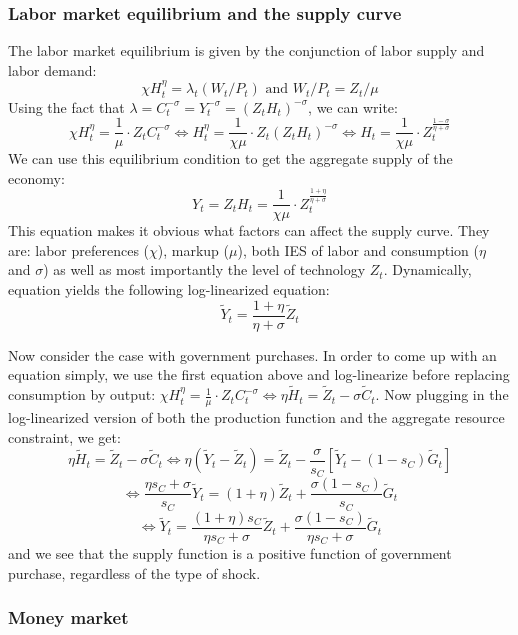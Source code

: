 \documentclass[12pt]{report}
\begin{document}
\subsubsection{Labor market equilibrium and the supply curve}

The labor market equilibrium is given by the conjunction of labor supply and labor demand: $$\chi H_t^\eta = \lambda_t(W_t/P_t) \text{ and } W_t/P_t = Z_t/\mu  $$ Using the fact that $\lambda = C_t^{-\sigma} = Y_t^{-\sigma} = (Z_tH_t)^{-\sigma}$, we can write: $$\chi H_t^\eta = \frac{1}{\mu}\cdot Z_t C_t^{-\sigma}  \Leftrightarrow H_t^\eta = \frac{1}{\chi\mu}\cdot Z_t (Z_t H_t)^{-\sigma} \Leftrightarrow H_t = \frac{1}{\chi\mu}\cdot Z_t^{\frac{1-\sigma}{\eta+\sigma}} $$ We can use this equilibrium condition to get the aggregate supply of the economy: $$ Y_t = Z_t H_t = \frac{1}{\chi\mu}\cdot Z_t^{\frac{1+\eta}{\eta+\sigma}} $$ This equation makes it obvious what factors can affect the supply curve. They are: labor preferences ($\chi$), markup ($\mu$), both IES of labor and consumption ($\eta$ and $\sigma$) as well as most importantly the level of technology $Z_t$. Dynamically, equation yields the following log-linearized equation: $$\tilde Y_t = \frac{1+\eta}{\eta+\sigma} \tilde Z_t $$

Now consider the case with government purchases. In order to come up with an equation simply, we use the first equation above and log-linearize before replacing consumption by output: $\chi H_t^\eta = \frac{1}{\mu}\cdot Z_t C_t^{-\sigma}  \Leftrightarrow \eta\tilde H_t = \tilde Z_t - \sigma\tilde C_t $. Now plugging in the log-linearized version of both the production function and the aggregate resource constraint, we get: $$\eta\tilde H_t = \tilde Z_t - \sigma\tilde C_t \Leftrightarrow \eta (\tilde Y_t - \tilde Z_t) = \tilde Z_t - \frac{\sigma}{s_C} \left[ \tilde Y_t - (1 - s_C) \tilde G_t \right] $$ $$ \Leftrightarrow \frac{\eta s_C + \sigma}{s_C} \tilde Y_t = (1 + \eta) \tilde Z_t + \frac{\sigma (1 - s_C)}{s_C} \tilde G_t $$ $$ \Leftrightarrow \tilde Y_t = \frac{(1 + \eta)s_C}{\eta s_C + \sigma} \tilde Z_t + \frac{\sigma (1 - s_C)}{\eta s_C + \sigma} \tilde G_t $$ and we see that the supply function is a positive function of government purchase, regardless of the type of shock.

\subsubsection{Money market}
\end{document}
